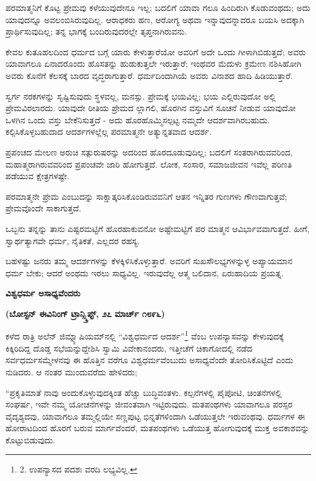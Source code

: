 ಪರಮಾತ್ಮನಿಗೆ ಕೊಟ್ಟ ಪ್ರೇಮವು ಕಳೆಯುವುದೇನೂ ಇಲ್ಲ; ಬದಲಿಗೆ ಯಾವಾ ಗಲೂ ಹಿಂದಿರುಗಿ ಕೊಡುವಂಥದು; ಅದು ಯಾವುದನ್ನೂ ಅವಲಂಬಿಸಿರುವುದಿಲ್ಲ. ಆರಾಧಕರು ಹಣ, ಆರೋಗ್ಯ ಅಥವಾ ಇನ್ನಾವುದನ್ನಾದರೂ ಬಯಸಿ ಅದಕ್ಕಾಗಿ ಪ್ರಾರ್ಥಿಸುವುದಿಲ್ಲ; ತನ್ನ ಭಾಗಕ್ಕೆ ಬಂದಿರುವುದರಲ್ಲೇ ತೃಪ್ತನಾಗಿರುವನು.

ಕೇವಲ ಕುತೂಹಲದಿಂದ ಧರ್ಮದ ಬಗ್ಗೆ ಯಾರು ಕೇಳುತ್ತಾರೆಯೋ ಅವರಿಗೆ ಅದೇ ಒಂದು ಗೀಳಾಗಿಬಿಡುತ್ತದೆ; ಅವರು ಯಾವಾಗಲೂ ಏನಾದರೊಂದು ಹೊಸತನ್ನು ಹುಡುಕುತ್ತಲೇ ಇರುತ್ತಾರೆ; ಇಂಥವರ ಮೆದುಳು ಕ್ರಮೇಣ ನಶಿಸಿಹೋಗಿ ಅವರು ಕೊನೆಗೆ ಕೆಲಸಕ್ಕೆ ಬಾರದ ವೃದ್ಧರಾಗುತ್ತಾರೆ. ಧರ್ಮದಿಂದಾಗಿಯೆ ಅವರು ವಿನಾಶದ ಹಾದಿ ಹಿಡಿಯುತ್ತಾರೆ.

ಸ್ವರ್ಗ ನರಕಗಳನ್ನು ಸೃಷ್ಟಿಸುವುದು ಸ್ಥಳವಲ್ಲ, ಮನಸ್ಸು. ಪ್ರೇಮಕ್ಕೆ ಭಯವಿಲ್ಲ; ಭಯ ಎಲ್ಲಿರುವುದೋ ಅಲ್ಲಿ ಪ್ರೇಮವಿರಲಾರದು. ಯಾವುದೇ ರೀತಿಯ ಪ್ರೇಮದ ಲ್ಲಾಗಲಿ, ಹೊರಗಿನ ವಸ್ತುವಿಗೆ ಸೂಚನೆ ನೀಡುವ ಯಾವುದೋ ಒಳಗಿನ ಒಂದು ವಸ್ತು ಬೇಕೆನಿಸುತ್ತದೆ - ಅದು ಹೊರಹೊಮ್ಮಿಸಲ್ಪಟ್ಟ ನಮ್ಮದೇ ಆದರ್ಶವಾಗಿರಬಹುದು. ಕಲ್ಪಿಸಿಕೊಳ್ಳಬಹುದಾದ ಆದರ್ಶಗಳಲ್ಲೆಲ್ಲ ಪರಮಾತ್ಮನೇ ಅತ್ಯುನ್ನತವಾದ ಆದರ್ಶ.

ಪ್ರಪಂಚದ ಮೇಲಣ ಅರುಚಿ ಸತ್ಪುರುಷರನ್ನು ಅದರಿಂದ ಹೊರದೂಡುವುದಿಲ್ಲ; ಬದಲಿಗೆ ಸಂತರಾಗಿರುವವರಿಂದ, ಮಹಾತ್ಮರಾಗಿರುವವರಿಂದ ಪ್ರಪಂಚವೇ ಜಾರಿ ಹೋಗುತ್ತದೆ. ಲೋಕ, ಸಂಸಾರ, ಸಮಾಜಜೀವನ ಇವೆಲ್ಲ ಪರಿಣತಿ ಪಡೆಯುವ ಕ್ಷೇತ್ರಗಳಷ್ಟೇ.

ಪರಮಾತ್ಮನೇ ಪ್ರೇಮ ಎಂಬುದನ್ನು ಸಾಕ್ಷಾತ್ಕರಿಸಿಕೊಂಡಿರುವವನಿಗೆ ಆತನ ಇನ್ನಿತರ ಗುಣಗಳು ಗೌಣವಾಗುತ್ತವೆ; ಪ್ರೇಮವೊಂದೇ ಸಾಕಾಗುತ್ತದೆ.

ಒಬ್ಬನು ತನ್ನನ್ನು ತಾನು ಎಷ್ಟರಮಟ್ಟಿಗೆ ಹೊರಹಾಕುವನೋ ಅಷ್ಟೇಮಟ್ಟಿಗೆ ಪರ ಮಾತ್ಮನ ಆವಿರ್ಭಾವವಾಗುತ್ತದೆ. ಹೀಗೆ, ಸ್ವಾರ್ಥತ್ಯಾಗವೇ ಧರ್ಮ, ನೈತಿಕತೆ, ಎಲ್ಲದರ ರಹಸ್ಯ.

ಬಹಳಷ್ಟು ಜನರು ತಮ್ಮ ಆದರ್ಶಗಳನ್ನು ಕೆಳಕ್ಕಿಳಿಸಿಕೊಳ್ಳುತ್ತಾರೆ. ಅವರಿಗೆ ಸುಖಸೌಲಭ್ಯಗಳನ್ನುಳ್ಳ ಅಪ್ಯಾಯಮಾನ ಧರ್ಮ ಬೇಕು; ಆದರೆ ಅಂಥದು ಇರಲು ಸಾಧ್ಯವಿಲ್ಲ. ಇರುವುದೆಲ್ಲ ಆತ್ಮ ಬಲಿದಾನ, ಏರುಹಾದಿಯ ಪ್ರಯತ್ನ.

\begin{center}
\textbf{ವಿಶ್ವಧರ್ಮ ಅಸಾಧ್ಯವೆಂದರು}
\end{center}

\begin{center}
\textbf{(ಬೋಸ್ಟನ್ ಈವಿನಿಂಗ್ ಟ್ರಾನ್ಸ್ಕ್ರಿಪ್ಟ್, ೨೭ ಮಾರ್ಚ್ ೧೮೯೬)}
\end{center}

ಕಳೆದ ರಾತ್ರಿ ಅಲೆನ್ ಜಿಮ್ನ್ಯಾಷಿಯಮ್​ನಲ್ಲಿ “ವಿಶ್ವಧರ್ಮದ ಆದರ್ಶ”\footnote{2. ಉಪನ್ಯಾಸದ ಪದಶಃ ವರದಿ ಲಭ್ಯವಿಲ್ಲ.} ವೆಂಬ ಉಪನ್ಯಾಸವನ್ನು ಕೇಳುವುದಕ್ಕೆ ಕಿಕ್ಕಿರಿದಿದ್ದ ದೊಡ್ಡ ಸಭೆಯನ್ನುದ್ದೇಶಿಸಿ ಸ್ವಾಮಿ ವಿವೇಕಾನಂದರು, ಇತ್ತೀಚೆಗೆ ಚಿಕಾಗೋದಲ್ಲಿ ನಡೆದ ಸರ್ವಧರ್ಮಸಮ್ಮೇಳನವು ಈ ಹೊತ್ತಿನ ವರೆಗೂ ವಿಶ್ವಧರ್ಮವೆಂಬುದು ಅಸಾಧ್ಯವೆಂದೇ ತೋರಿಸಿಕೊಟ್ಟಿದೆ ಎಂದು ನುಡಿದರು. ಆ ನಂತರ ಮುಂದುವರೆದು ಹೇಳಿದರು;

“ಪ್ರಕೃತಿಮಾತೆ ನಾವು ಅಂದುಕೊಳ್ಳುವುದಕ್ಕಿಂತ ಹೆಚ್ಚು ಬುದ್ಧಿವಂತಳು. ಕಲ್ಪನೆಗಳಲ್ಲಿ ಪೈಪೋಟಿ, ಚಿಂತನೆಗಳಲ್ಲಿ ಸಂಘರ್ಷ, ಇವೇ ನಮ್ಮ ಯೋಚನೆಗಳನ್ನು ಜೀವಂತವಾಗಿ ಇಟ್ಟಿರುವುದು. ಮತಪಂಥಗಳು ಯಾವಾಗಲೂ ಪರಸ್ಪರ ವೈದೃಶ್ಯದವು, ಯಾವಾಗಲೂ ತಮ್ಮಲ್ಲಿಯೇ ಸಣ್ಣಪುಟ್ಟ ಭಿನ್ನತೆಗಳಿಂದಾಗಿ ಒಡೆಯುತ್ತಲೇ ಇರುವಂಥವು. ಧರ್ಮಗಳ ಈ ಹೋರಾಟದಿಂದ ಹೊರಗೆ ಬರುವ ಮಾರ್ಗವೆಂದರೆ, ಮತಪಂಥಗಳು ಒಡೆಯುತ್ತ ಹೋಗುವುದಕ್ಕೆ ಮುಕ್ತ ಅವಕಾಶವನ್ನು ಕೊಟ್ಟುಬಿಡುವುದು.

